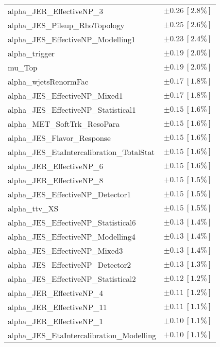 \begin{table}
\begin{center}
\begin{tabular*}{\textwidth}{@{\extracolsep{\fill}}lc}
alpha\_JER\_EffectiveNP\_3         & $\pm 0.26\ [2.8\%] $       \\
alpha\_JES\_Pileup\_RhoTopology         & $\pm 0.25\ [2.6\%] $       \\
alpha\_JES\_EffectiveNP\_Modelling1         & $\pm 0.23\ [2.4\%] $       \\
alpha\_trigger         & $\pm 0.19\ [2.0\%] $       \\
mu\_Top         & $\pm 0.19\ [2.0\%] $       \\
alpha\_wjetsRenormFac         & $\pm 0.17\ [1.8\%] $       \\
alpha\_JES\_EffectiveNP\_Mixed1         & $\pm 0.17\ [1.8\%] $       \\
alpha\_JES\_EffectiveNP\_Statistical1         & $\pm 0.15\ [1.6\%] $       \\
alpha\_MET\_SoftTrk\_ResoPara         & $\pm 0.15\ [1.6\%] $       \\
alpha\_JES\_Flavor\_Response         & $\pm 0.15\ [1.6\%] $       \\
alpha\_JES\_EtaIntercalibration\_TotalStat         & $\pm 0.15\ [1.6\%] $       \\
alpha\_JER\_EffectiveNP\_6         & $\pm 0.15\ [1.6\%] $       \\
alpha\_JER\_EffectiveNP\_8         & $\pm 0.15\ [1.5\%] $       \\
alpha\_JES\_EffectiveNP\_Detector1         & $\pm 0.15\ [1.5\%] $       \\
alpha\_ttv\_XS         & $\pm 0.15\ [1.5\%] $       \\
alpha\_JES\_EffectiveNP\_Statistical6         & $\pm 0.13\ [1.4\%] $       \\
alpha\_JES\_EffectiveNP\_Modelling4         & $\pm 0.13\ [1.4\%] $       \\
alpha\_JES\_EffectiveNP\_Mixed3         & $\pm 0.13\ [1.4\%] $       \\
alpha\_JES\_EffectiveNP\_Detector2         & $\pm 0.13\ [1.3\%] $       \\
alpha\_JES\_EffectiveNP\_Statistical2         & $\pm 0.12\ [1.2\%] $       \\
alpha\_JER\_EffectiveNP\_4         & $\pm 0.11\ [1.2\%] $       \\
alpha\_JER\_EffectiveNP\_11         & $\pm 0.11\ [1.1\%] $       \\
alpha\_JER\_EffectiveNP\_1         & $\pm 0.10\ [1.1\%] $       \\
alpha\_JES\_EtaIntercalibration\_Modelling         & $\pm 0.10\ [1.1\%] $       \\

\end{tabular*}
\end{center}
\end{table}
